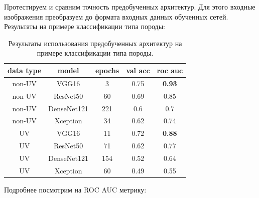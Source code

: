 \documentclass[14pt]{matmex-diploma}
\begin{document}
        Протестируем и сравним точность предобученных архитектур. Для этого входные изображения преобразуем до формата входных данных обученных сетей. Результаты на примере классификации типа породы:
        
        \begin{table}[h!]
            \centering
            \begin{tabular}{|c|c|c|c|c|}
            \hline
            \textbf{data type} & \textbf{model} & \textbf{epochs} & \textbf{val acc} & \textbf{roc auc} \\ \hline
            non-UV             & VGG16          & 3               & 0.75             & \textbf{0.93}    \\ \hline
            non-UV             & ResNet50       & 60              & 0.69             & 0.85             \\ \hline
            non-UV             & DenseNet121    & 221             & 0.6              & 0.7              \\ \hline
            non-UV             & Xception       & 34              & 0.62             & 0.74             \\ \hline
            UV                 & VGG16          & 11              & 0.72             & \textbf{0.88}    \\ \hline
            UV                 & ResNet50       & 71              & 0.62             & 0.77             \\ \hline
            UV                 & DenseNet121    & 154             & 0.52             & 0.64             \\ \hline
            UV                 & Xception       & 60              & 0.49             & 0.55             \\ \hline
            \end{tabular}
            \caption{Результаты использования предобученных архитектур на примере классификации типа породы.}
            \label{results}   
        \end{table}
        
        Подробнее посмотрим на ROC AUC метрику:
    
\end{document}
